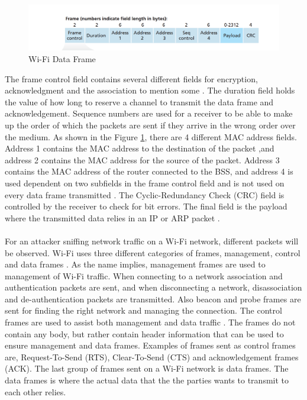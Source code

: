 \begin{figure} [!h]
    \includegraphics[width=1\textwidth]{figures/WifiDataFrame.png}
    \caption{Wi-Fi Data Frame \cite{Datacom}}
    \centering
    \label{fig:WiFiDataframe}
\end{figure}

The frame control field contains several different fields for encryption, acknowledgment and the association to mention some \cite{Datacom}. The duration field holds the value of how long to reserve a channel to transmit the data frame and acknowledgement. Sequence numbers are used for a receiver to be able to make up the order of which the packets are sent if they arrive in the wrong order over the medium. As shown in the Figure \ref{fig:WiFiDataframe}, there are 4 different MAC address fields. Address 1 contains the MAC address to the destination of the packet ,and address 2 contains the MAC address for the source of the packet. Address 3 contains the MAC address of the router connected to the BSS, and address 4 is used dependent on two subfields in the frame control field and is not used on every data frame transmitted \cite{WifiStandard}. The Cyclic-Redundancy Check (CRC) field is controlled by the receiver to check for bit errors. The final field is the payload where the transmitted data relies in an IP or ARP packet \cite{Datacom}. 
\\\\
For an attacker sniffing network traffic on a Wi-Fi network, different packets will be observed. Wi-Fi uses three different categories of frames, management, control and data frames \cite{WiFiFrameMGMT}. As the name implies, management frames are used to management of Wi-Fi traffic. When connecting to a network association and authentication packets are sent, and when disconnecting a network, disassociation and de-authentication packets are transmitted. Also beacon and probe frames are sent for finding the right network and managing the connection. The control frames are used to assist both management and data traffic \cite{WiFiFrames}. The frames do not contain any body, but rather contain header information that can be used to ensure management and data frames. Examples of frames sent as control frames are, Request-To-Send (RTS), Clear-To-Send (CTS) and acknowledgement frames (ACK). The last group of frames sent on a Wi-Fi network is data frames. The data frames is where the actual data that the the parties wants to transmit to each other relies. 
